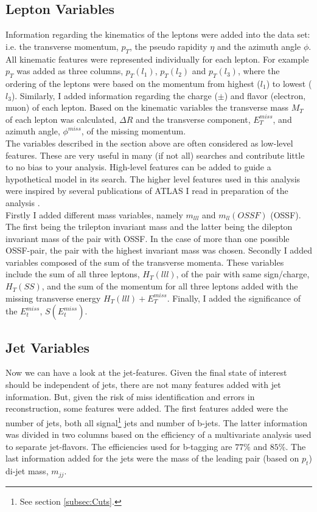 \subsection{Lepton Variables}\label{subsec:LepSel}
Information regarding the kinematics of the leptons were added into the data set: i.e. the transverse momentum, $p_T$, the pseudo 
rapidity $\eta$ and the azimuth angle $\phi$. All kinematic features were represented individually for each lepton. For example $p_T$
was added as three columns, $p_T(l_1)$, $p_T(l_2)$ and $p_T(l_3)$, where the ordering of the leptons were based on the momentum from highest ($l_1$) to lowest ($l_3$).
Similarly, I added information regarding the charge ($\pm$) and flavor (electron, muon) of each lepton. Based on the kinematic variables
the transverse mass $M_T$ of each lepton was calculated, $\Delta R$ and the transverse component, $E_T^{miss}$, and azimuth angle, $\phi^{miss}$,
of the missing momentum.
\\
The variables described in the section above are often considered as low-level features. These are very useful in many (if not all)
searches and contribute little to no bias to your analysis. High-level features can be added to guide a hypothetical model 
in its search. The higher level features used in this analysis were inspired by several publications of \ac{ATLAS} I read in 
preparation of the analysis \cite{franchini_search_2019, atlas_search_2021}. 
\\
Firstly I added different mass variables, namely $m_{lll}$ and $m_{ll}(OSSF)$ (\ac{OSSF}). The first being the trilepton invariant mass 
and the latter being the dilepton invariant mass of the pair with \ac{OSSF}. In the case of more than one possible \ac{OSSF}-pair,
the pair with the highest invariant mass was chosen. Secondly I added variables composed of the sum of the transverse momenta.
These variables include the sum of all three leptons, $H_T(lll)$, of the pair with same sign/charge, $H_T(SS)$, and the sum of the momentum
for all three leptons added with the missing transverse energy $H_T(lll) + E_T^{miss}$. Finally, I added the significance of the
$E_t^{miss}$, $S(E_t^{miss})$.
\subsection{Jet Variables}\label{subsec:JetSel}
Now we can have a look at the jet-features. Given the final state of interest should be independent of jets, there are not many
features added with jet information. But, given the risk of miss identification and errors in reconstruction, some features were 
added. The first features added were the number of jets, both all signal\footnote{See section \ref{subsec:Cuts}.} jets and number of b-jets.
The latter information was divided in two columns based on the efficiency of a multivariate analysis used to separate jet-flavors.
The efficiencies used for b-tagging are $77\%$ and $85\%$. The last information added for the jets were the mass of the leading pair 
(based on $p_t$) di-jet mass, $m_{jj}$.
